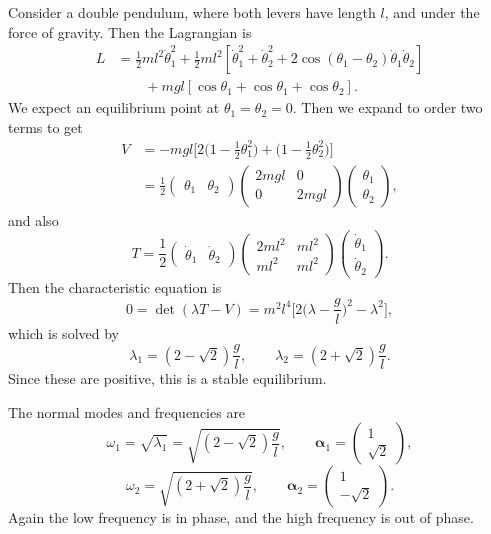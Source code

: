 \documentclass[12pt]{article}
\begin{document}
\begin{exbox}
	Consider a double pendulum, where both levers have length $l$, and under the force of gravity. Then the Lagrangian is
	\begin{align*}
		L &= \frac{1}{2}m l^2 \dot \theta_1^2 + \frac{1}{2} ml^2 [\dot \theta_1^2 + \dot \theta_2^2 + 2 \cos(\theta_1-\theta_2)\dot \theta_1 \dot \theta_2] \\
		  &\qquad +mgl[\cos \theta_1 + \cos \theta_1 + \cos \theta_2].
	\end{align*}
	We expect an equilibrium point at $\theta_1 = \theta_2 = 0$. Then we expand to order two terms to get
	\begin{align*}
		V &= - mgl\biggl[2 \biggl(1 - \frac{1}{2} \theta_1^2 \biggr) + \biggl(1 - \frac{1}{2} \theta_2^2 \biggr) \biggr] \\
		  &= \frac{1}{2}
		  \begin{pmatrix}
			  \theta_1 & \theta_2
		  \end{pmatrix}
		  \begin{pmatrix}
			  2 mgl & 0 \\
			  0 & 2mgl
		  \end{pmatrix}
		  \begin{pmatrix}
		  	\theta_1 \\ \theta_2
		  \end{pmatrix},
	\end{align*}
	and also
	\[
	T = \frac{1}{2}
	\begin{pmatrix}
		\dot\theta_1 & \dot\theta_2
	\end{pmatrix}
	\begin{pmatrix}
		2ml^2 & ml^2 \\
		ml^2 & ml^2
	\end{pmatrix}
	\begin{pmatrix}
		\dot \theta_1 \\ \dot \theta_2
	\end{pmatrix}.
	\]
	Then the characteristic equation is
	\[
		0 = \det(\lambda T - V) = m^2l^{4}\biggl[2 \biggl(\lambda - \frac{g}{l} \biggr)^2 - \lambda^2 \biggr],
	\]
	which is solved by
	\[
	\lambda_1 = (2 - \sqrt 2)\frac{g}{l}, \qquad \lambda_2 = (2 + \sqrt 2)\frac{g}{l}.
	\]
	Since these are positive, this is a stable equilibrium.

	The normal modes and frequencies are
	\[
		\omega_1 = \sqrt{\lambda_1} = \sqrt{(2-\sqrt 2)\frac{g}{l}}, \qquad \bm{\alpha}_1 =
		\begin{pmatrix}
			1 \\ \sqrt 2
		\end{pmatrix},
	\]
	\[
		\omega_2 = \sqrt{(2+\sqrt 2)\frac{g}{l}}, \qquad \bm{\alpha}_2 =
		\begin{pmatrix}
			1 \\ -\sqrt 2
		\end{pmatrix}.
	\]
	Again the low frequency is in phase, and the high frequency is out of phase.
\end{exbox}
\end{document}

